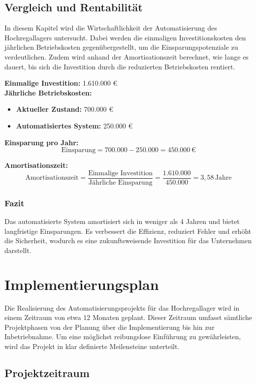 \section{Vergleich und Rentabilität}
In diesem Kapitel wird die Wirtschaftlichkeit der Automatisierung des Hochregallagers untersucht. Dabei werden die einmaligen Investitionskosten den jährlichen Betriebskosten gegenübergestellt, um die Einsparungspotenziale zu verdeutlichen. Zudem wird anhand der Amortisationszeit berechnet, wie lange es dauert, bis sich die Investition durch die reduzierten Betriebskosten rentiert. 

\textbf{Einmalige Investition:} 1.610.000 € \\

\textbf{Jährliche Betriebskosten:}
\begin{itemize}
	\item \textbf{Aktueller Zustand:} 700.000 €
	\item \textbf{Automatisiertes System:} 250.000 €
\end{itemize}

\textbf{Einsparung pro Jahr:}  
\[
\text{Einsparung} = 700.000 - 250.000 = 450.000 \, \text{€}
\]

\textbf{Amortisationszeit:}  
\[
\text{Amortisationszeit} = \frac{\text{Einmalige Investition}}{\text{Jährliche Einsparung}} = \frac{1.610.000}{450.000} = 3{,}58\, \text{Jahre}
\]

\subsection*{Fazit}
Das automatisierte System amortisiert sich in weniger als 4 Jahren und bietet langfristige Einsparungen. Es verbessert die Effizienz, reduziert Fehler und erhöht die Sicherheit, wodurch es eine zukunftsweisende Investition für das Unternehmen darstellt.


\chapter{Implementierungsplan}

Die Realisierung des Automatisierungsprojekts für das Hochregallager wird in einem Zeitraum von etwa 12 Monaten geplant. Dieser Zeitraum umfasst sämtliche Projektphasen von der Planung über die Implementierung bis hin zur Inbetriebnahme. Um eine möglichst reibungslose Einführung zu gewährleisten, wird das Projekt in klar definierte Meilensteine unterteilt.

\section{Projektzeitraum}

